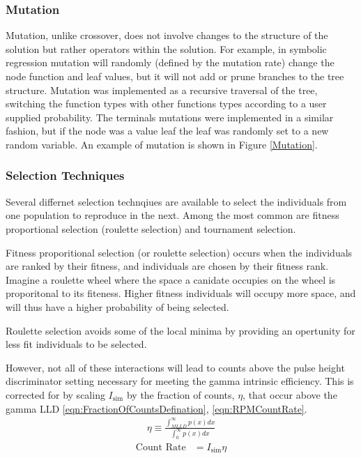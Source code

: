 \begin{itemize}
\subsubsection{Mutation}

Mutation, unlike crossover, does not involve changes to the structure
of the solution but rather operators within the solution. For example,
in symbolic regression mutation will randomly (defined by the mutation
rate) change the node function and leaf values, but it will not add
or prune branches to the tree structure. Mutation was implemented
as a recursive traversal of the tree, switching the function types
with other functions types according to a user supplied probability.
The terminals mutations were implemented in a similar fashion, but
if the node was a value leaf the leaf was randomly set to a new random
variable. An example of mutation is shown in Figure \ref{Mutation}.

\subsubsection{Selection Techniques}
Several differnet selection technqiues are available to select the individuals from one population to reproduce in the next.
Among the most common are fitness proportional selection (roulette selection) and tournament selection.

Fitness proporitional selection (or roulette selection) occurs when the individuals are ranked by their fitness, and individuals are chosen by their fitness rank.
Imagine a roulette wheel where the space a canidate occupies on the wheel is proporitonal to its fiteness.  
Higher fitness individuals will occupy more space, and will thus have a higher probability of being selected.

Roulette selection avoids some of the local minima by providing an opertunity for less fit individuals to be selected.



However, not all of these interactions will lead to counts above the pulse height discriminator setting necessary for meeting the gamma intrinsic efficiency.
This is corrected for by scaling $I_{\text{sim}}$ by the fraction of counts, $\eta$, that occur above the gamma LLD \eqref{eqn:FractionOfCountsDefination}, \eqref{eqn:RPMCountRate}.
\begin{align}
  \label{eqn:FractionOfCountsDefination}
  \eta \equiv \frac{\int_{MLLD}^\infty p(x)dx}{\int_0^\infty p(x)dx}
\end{align}
\begin{align}
 \label{eqn:RPMCountRate}
 \text{Count Rate} &= I_{\text{sim}} \eta
\end{align}


\end{itemize}
